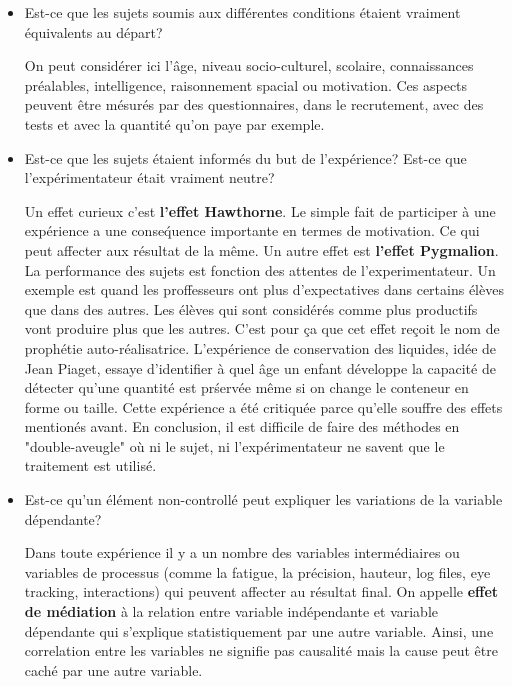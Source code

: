 \begin{itemize}
\item Est-ce que les sujets soumis aux diff\'erentes conditions \'etaient vraiment \'equivalents au d\'epart?

On peut consid\'erer ici l'\^age, niveau socio-culturel, scolaire, connaissances pr\'ealables, intelligence, raisonnement spacial ou motivation. Ces aspects peuvent \^etre m\'esur\'es par des questionnaires, dans le recrutement, avec des tests et avec la quantit\'e qu'on paye par exemple.

\item Est-ce que les sujets \'etaient inform\'es du but de l'exp\'erience? Est-ce que l'exp\'erimentateur \'etait vraiment neutre?

Un effet curieux c'est \textbf{l'effet Hawthorne}. Le simple fait de participer \`a une exp\'erience a une conse\'quence importante en termes de motivation. Ce qui peut affecter aux r\'esultat de la m\^eme. Un autre effet est \textbf{l'effet Pygmalion}. La performance des sujets est fonction des attentes de l'experimentateur. Un exemple est quand les proffesseurs ont plus d'expectatives dans certains \'el\`eves que dans des autres. Les \'el\`eves qui sont consid\'er\'es comme plus productifs vont produire plus que les autres. C'est pour \c{c}a que cet effet re\c{c}oit le nom de proph\'etie auto-r\'ealisatrice. L'exp\'erience de conservation des liquides, id\'ee de Jean Piaget, essaye d'identifier \`a quel \^age un enfant d\'eveloppe la capacit\'e de d\'etecter qu'une quantit\'e est pr\'serv\'ee m\^eme si on change le conteneur en forme ou taille. Cette exp\'erience a \'et\'e critiqu\'ee parce qu'elle souffre des effets mention\'es avant. En conclusion, il est difficile de faire des m\'ethodes en "double-aveugle" o\`u ni le sujet, ni l'exp\'erimentateur ne savent que le traitement est utilis\'e.

\item Est-ce qu'un \'el\'ement non-controll\'e peut expliquer les variations de la variable d\'ependante?

Dans toute exp\'erience il y a un nombre des variables interm\'ediaires ou variables de processus (comme la fatigue, la pr\'ecision, hauteur, log files, eye tracking, interactions) qui peuvent affecter au r\'esultat final. On appelle \textbf{effet de m\'ediation} \`a la relation entre variable ind\'ependante et variable d\'ependante qui s'explique statistiquement par une autre variable. Ainsi, une correlation entre les variables ne signifie pas causalit\'e mais la cause peut \^etre cach\'e par une autre variable.


\end{itemize}
